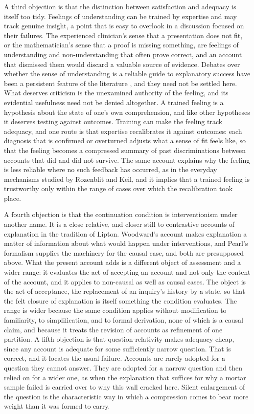 \documentclass[11pt,letterpaper]{article}
\theoremstyle{definition}
\begin{document}
A third objection is that the distinction between satisfaction and adequacy is itself too tidy. Feelings of understanding can be trained by expertise and may track genuine insight, a point that is easy to overlook in a discussion focused on their failures. The experienced clinician's sense that a presentation does not fit, or the mathematician's sense that a proof is missing something, are feelings of understanding and non-understanding that often prove correct, and an account that dismissed them would discard a valuable source of evidence. Debates over whether the sense of understanding is a reliable guide to explanatory success have been a persistent feature of the literature \cite{trout2002,gopnik1998}, and they need not be settled here. What deserves criticism is the unexamined authority of the feeling, and its evidential usefulness need not be denied altogether. A trained feeling is a hypothesis about the state of one's own comprehension, and like other hypotheses it deserves testing against outcomes. Training can make the feeling track adequacy, and one route is that expertise recalibrates it against outcomes: each diagnosis that is confirmed or overturned adjusts what a sense of fit feels like, so that the feeling becomes a compressed summary of past discriminations between accounts that did and did not survive. The same account explains why the feeling is less reliable where no such feedback has occurred, as in the everyday mechanisms studied by Rozenblit and Keil, and it implies that a trained feeling is trustworthy only within the range of cases over which the recalibration took place.

A fourth objection is that the continuation condition is interventionism under another name. It is a close relative, and closer still to contrastive accounts of explanation in the tradition of Lipton. Woodward's account makes explanation a matter of information about what would happen under interventions, and Pearl's formalism supplies the machinery for the causal case, and both are presupposed above. What the present account adds is a different object of assessment and a wider range: it evaluates the act of accepting an account and not only the content of the account, and it applies to non-causal as well as causal cases. The object is the act of acceptance, the replacement of an inquiry's history by a state, so that the felt closure of explanation is itself something the condition evaluates. The range is wider because the same condition applies without modification to familiarity, to simplification, and to formal derivation, none of which is a causal claim, and because it treats the revision of accounts as refinement of one partition. A fifth objection is that question-relativity makes adequacy cheap, since any account is adequate for some sufficiently narrow question. That is correct, and it locates the usual failure. Accounts are rarely adopted for a question they cannot answer. They are adopted for a narrow question and then relied on for a wider one, as when the explanation that suffices for why a mortar sample failed is carried over to why this wall cracked here. Silent enlargement of the question is the characteristic way in which a compression comes to bear more weight than it was formed to carry.
\end{document}
